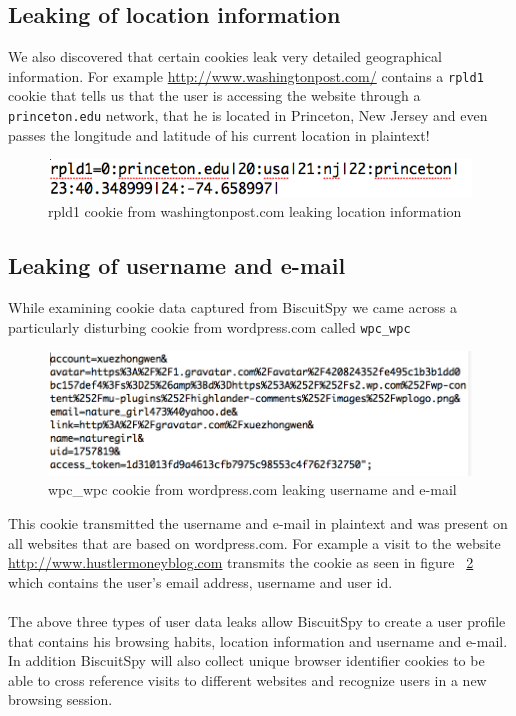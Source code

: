 \subsection{Leaking of location information}
We also discovered that certain cookies leak very detailed geographical information. For example \url{http://www.washingtonpost.com/} contains a \texttt{rpld1} cookie that tells us that the user is accessing the website through a \texttt{princeton.edu} network, that he is located in Princeton, New Jersey and even passes the longitude and latitude of his current location in plaintext!

\begin{figure}[h]
\centering
\includegraphics[scale=0.5]{./diagrams/location.png}
\caption{rpld1 cookie from washingtonpost.com leaking location information}
\label{fig:location}
\end{figure}


\subsection{Leaking of username and e-mail}

While examining cookie data captured from BiscuitSpy we came across a particularly disturbing cookie from wordpress.com called \texttt{wpc\_wpc}
\begin{figure}[h]
\centering
\includegraphics[scale=0.4]{./diagrams/wpc.png}
\caption{wpc\_wpc cookie from wordpress.com leaking username and e-mail}
\label{fig:wpc}
\end{figure}

 This cookie transmitted the username and e-mail in plaintext and was present on all websites that are based on wordpress.com. For example a visit to the website \url{http://www.hustlermoneyblog.com} transmits the cookie as seen in figure ~\ref{fig:wpc} which contains the user's email address, username and user id.
\\
\\
The above three types of user data leaks allow BiscuitSpy to create a user profile that contains his browsing habits, location information and username and e-mail. In addition BiscuitSpy will also collect unique browser identifier cookies to be able to cross reference visits to different websites and recognize users in a new browsing session.

